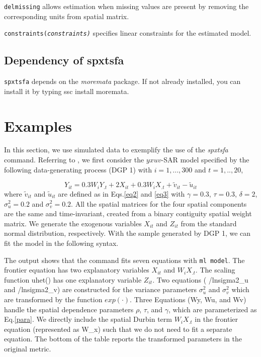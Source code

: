 \hangpara
{\tt delmissing} allows estimation  when missing values are present by  removing the corresponding units from spatial matrix. 

\hangpara
{\tt constraints(\it constraints)}  specifies linear constraints for the estimated model. 


\subsection{Dependency of spxtsfa}
{\tt spxtsfa} depends on the {\it moremata }package. If not already installed, you can install it by typing ssc install moremata.


\section{Examples}\label{sec_example}
In this section, we use simulated data to  exemplify the use of the \textit{spxtsfa} command.  Referring to , we first consider the $yxuv$-SAR model specified by the following data-generating process (DGP 1) with $i=1,...,300$ and $t=1,..,20$,

\begin{equation}\label{dgp1}
	Y_{it} = 0.3W_{i}Y_{.t}+2X_{it}+ 0.3W_{i}X_{.t}  + \tilde{v}_{it}-\tilde{u}_{it}
\end{equation}
where $\tilde{v}_{it}$ and $\tilde{u}_{it}$ are defined as in Eqs.\eqref{eq2} and \eqref{eq3} with $\gamma=0.3$, $\tau=0.3$, $\delta=2$, $\sigma_{u}^2=0.2$ and $\sigma_v^2 =0.2$. All the spatial matrices for the four spatial components are the same and time-invariant, created from a binary contiguity spatial weight matrix. We generate the exogenous variables $X_{it}$ and $Z_{it}$ from the standard normal distribution, respectively. With the sample generated by DGP 1, we can fit the model in the following syntax.

\begin{stlog}
	
\end{stlog}

The output shows that the command fits seven equations with {\tt ml model}. The frontier equation has two explanatory variables $X_{it}$ and $W_iX_{.t}$. The scaling function uhet() has one explanatory variable $Z_{it}$.  Two equations ( /lnsigma2\_u and /lnsigma2\_v) are constructed for the variance parameters $\sigma_u^2$ and $\sigma_v^2$ which are transformed by the function $exp(\cdot)$. Three Equations (Wy, Wu, and Wv) handle the spatial dependence parameters $\rho$, $\tau$, and $\gamma$, which are parameterized as Eq.\eqref{para}. We directly include the spatial Durbin term $W_iX_{.t}$ in the frontier equation  (represented as W\_x) such that we do not need to fit a separate equation.  The bottom of the table reports the transformed parameters in the original metric.


